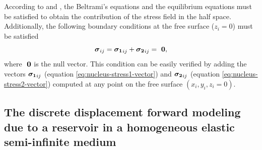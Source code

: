 \documentclass[journal abbreviation, manuscript]{copernicus}
\begin{document}
According to \cite{Sharma56} and \cite{Tempone10}, the Beltrami’s equations \citep{Beltrami} and the equilibrium equations must be satisfied to obtain the contribution of the stress field in the half space. 
Additionally, the following boundary conditions at the free surface ($z_i = 0$) 
must be satisfied
\begin{equation}
\mbox{\boldmath$\sigma$}_{ij} = \mbox{\boldmath$\sigma_{1}$}_{ij} + 
\mbox{\boldmath$\sigma_{2}$}_{ij} = \mbox{ \boldmath$0$},
\label{eq:null_stress}
\end{equation}
where $\mbox{ \boldmath$0$}$ is the null vector.
This condition can be easily verified by adding the vectors 
$\mbox{\boldmath$\sigma_{1}$}_{ij}$ (equation \ref{eq:nucleus-stress1-vector}) and 
$\mbox{\boldmath$\sigma_{2}$}_{ij}$ (equation \ref{eq:nucleus-stress2-vector}) 
computed at any point on the free surface $(x_i, y_i, z_i = 0)$.


\subsection{The discrete displacement forward modeling due to a reservoir in a homogeneous elastic semi-infinite medium} \label{u-model}
\end{document}
